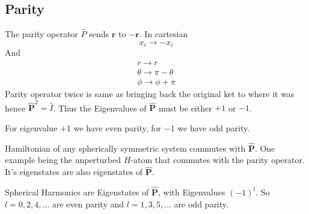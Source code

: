 \documentclass[10pt]{article}
\renewcommand{\vec}{\mathbf}
\begin{document}
\subsection*{Parity} 
The parity operator $\hat{P}$ sends $\vec{r}$ to $- \vec{r}$. In cartesian 
\[
x_i \to  - x_i
\]  
And 
\begin{align*}
r \to  r \\ 
\theta \to  \pi - \theta \\ 
\phi \to  \phi + \pi 
\end{align*}
Parity operator twice is same as bringing back the original ket to where it was hence $\hat{\vec{P}}^2 = \hat{I}$. Thus the Eigenvalues of $\hat{\vec{P}}$ must be either $+1$ or $-1$. 

For eigenvalue $+1$ we have even parity, for $-1$ we have odd parity.

Hamiltonian of any spherically symmetric system commutes with $\hat{\vec{P}}$. One example being the unperturbed $H$-atom that commutes with the parity operator. It's eigenstates are also eigenstates of $\hat{\vec{P}}$.

Spherical Harmonics are Eigenstates of $\hat{\vec{P}}$, with Eigenvalues $(-1)^{l}$. So $l = 0,2,4, \ldots$ are even parity and $l = 1, 3, 5, \ldots$ are odd parity.
\end{document}
